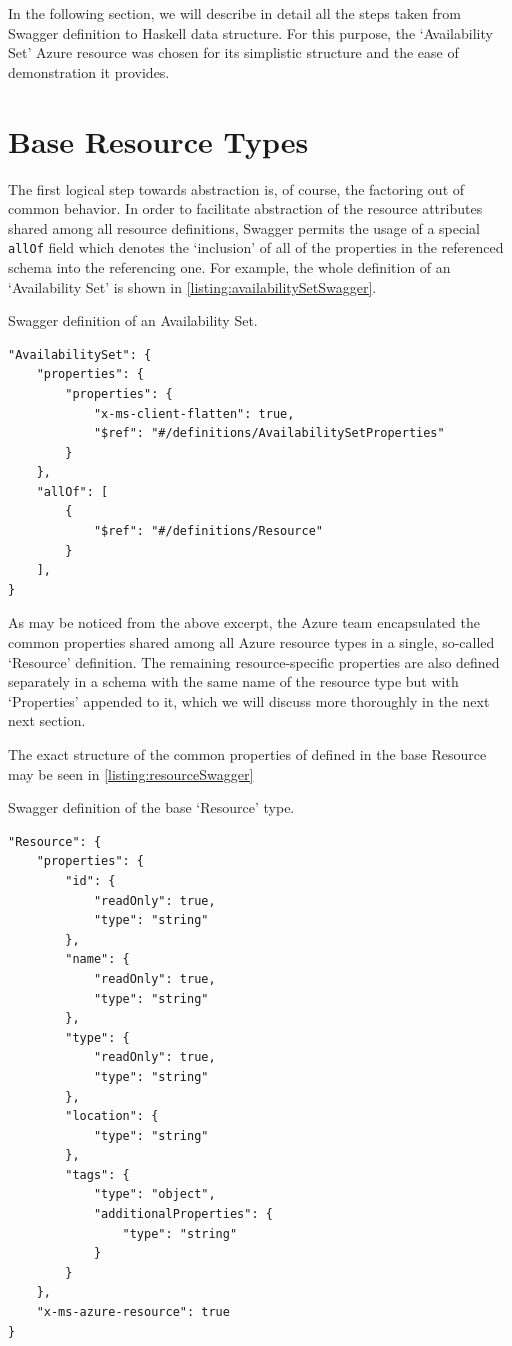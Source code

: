 \documentclass[11pt]{report}
\begin{document}

In the following section, we will describe in detail all the steps taken from
Swagger definition to Haskell data structure. For this purpose, the
`Availability Set' Azure resource was chosen for its simplistic structure and
the ease of demonstration it provides.

\section{Base Resource Types}

The first logical step towards abstraction is, of course, the factoring out of
common behavior. In order to facilitate abstraction of the resource attributes
shared among all resource definitions, Swagger permits the usage of a special
\texttt{allOf} field which denotes the `inclusion' of all of the properties in
the referenced schema into the referencing one. For example, the whole
definition of an `Availability Set' is shown in
\autoref{listing:availabilitySetSwagger}.

\begin{listing}[H]
\caption{Swagger definition of an Availability Set.}
\label{listing:availabilitySetSwagger}
\begin{verbatim}
"AvailabilitySet": {
    "properties": {
        "properties": {
            "x-ms-client-flatten": true,
            "$ref": "#/definitions/AvailabilitySetProperties"
        }
    },
    "allOf": [
        {
            "$ref": "#/definitions/Resource"
        }
    ],
}
\end{verbatim}
\end{listing}

As may be noticed from the above excerpt, the Azure team encapsulated the
common properties shared among all Azure resource types in a single, so-called
`Resource' definition. The remaining resource-specific properties are also
defined separately in a schema with the same name of the resource type but
with `Properties' appended to it, which we will discuss more thoroughly in the
next next section.

The exact structure of the common properties of defined in the base
Resource may be seen in \autoref{listing:resourceSwagger}

\begin{listing}[H]
\caption{Swagger definition of the base `Resource' type.}
\label{listing:resourceSwagger}
\begin{verbatim}
"Resource": {
    "properties": {
        "id": {
            "readOnly": true,
            "type": "string"
        },
        "name": {
            "readOnly": true,
            "type": "string"
        },
        "type": {
            "readOnly": true,
            "type": "string"
        },
        "location": {
            "type": "string"
        },
        "tags": {
            "type": "object",
            "additionalProperties": {
                "type": "string"
            }
        }
    },
    "x-ms-azure-resource": true
}
\end{verbatim}
\end{listing}
\end{document}
